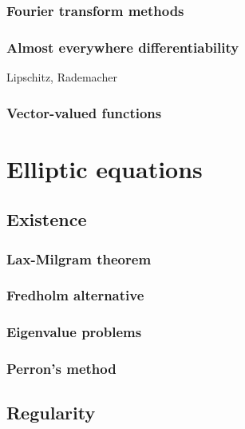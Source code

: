\documentclass{../note}
\begin{document}
\section{Fourier transform methods}
\section{Almost everywhere differentiability}
Lipschitz, Rademacher
\section{Vector-valued functions}








\part{Elliptic equations}

\chapter{Existence}
\section{Lax-Milgram theorem}
\section{Fredholm alternative}
\section{Eigenvalue problems}
\section{Perron's method}

\chapter{Regularity}
\end{document}
